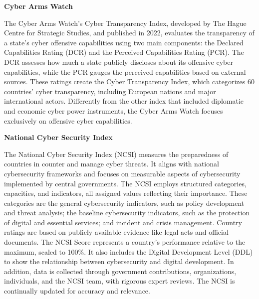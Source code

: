 \textbf{Cyber Arms Watch}

The Cyber Arms Watch's Cyber Transparency Index, developed by The Hague Centre for Strategic Studies, and published in 2022, evaluates the transparency of a state's cyber offensive capabilities using two main components: the Declared Capabilities Rating (DCR) and the Perceived Capabilities Rating (PCR). The DCR assesses how much a state publicly discloses about its offensive cyber capabilities, while the PCR gauges the perceived capabilities based on external sources. These ratings create the Cyber Transparency Index, which categorizes 60 countries' cyber transparency, including European nations and major international actors. Differently from the other index that included diplomatic and economic cyber power instruments, the Cyber Arms Watch focuses exclusively on offensive cyber capabilities. 


\textbf{National Cyber Security Index}

The National Cyber Security Index (NCSI) measures the preparedness of countries in counter and manage cyber threats. It aligns with national cybersecurity frameworks and focuses on measurable aspects of cybersecurity implemented by central governments. The NCSI employs structured categories, capacities, and indicators, all assigned values reflecting their importance. These categories are the general cybersecurity indicators, such as policy development and threat analysis; the baseline cybersecurity indicators, such as the protection of digital and essential services; and incident and crisis management. Country ratings are based on publicly available evidence like legal acts and official documents. The NCSI Score represents a country's performance relative to the maximum, scaled to 100\%. It also includes the Digital Development Level (DDL) to show the relationship between cybersecurity and digital development. In addition, data is collected through government contributions, organizations, individuals, and the NCSI team, with rigorous expert reviews. The NCSI is continually updated for accuracy and relevance.

